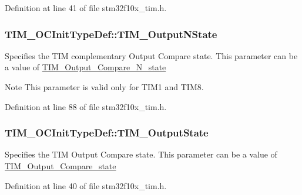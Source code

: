 Definition at line 41 of file stm32f10x\+\_\+tim.\+h.

\subsubsection[{\texorpdfstring{T\+I\+M\+\_\+\+Output\+N\+State}{TIM_OutputNState}}]{ T\+I\+M\+\_\+\+O\+C\+Init\+Type\+Def\+::\+T\+I\+M\+\_\+\+Output\+N\+State}\hypertarget{struct_t_i_m___o_c_init_type_def_a933904d2f892d0b945a908b9257fe869}{}\label{struct_t_i_m___o_c_init_type_def_a933904d2f892d0b945a908b9257fe869}
Specifies the T\+IM complementary Output Compare state. This parameter can be a value of \hyperlink{group___t_i_m___output___compare___n__state}{T\+I\+M\+\_\+\+Output\+\_\+\+Compare\+\_\+\+N\+\_\+state} \begin{DoxyNote}{Note}
This parameter is valid only for T\+I\+M1 and T\+I\+M8. 
\end{DoxyNote}


Definition at line 88 of file stm32f10x\+\_\+tim.\+h.

\subsubsection[{\texorpdfstring{T\+I\+M\+\_\+\+Output\+State}{TIM_OutputState}}]{ T\+I\+M\+\_\+\+O\+C\+Init\+Type\+Def\+::\+T\+I\+M\+\_\+\+Output\+State}\hypertarget{struct_t_i_m___o_c_init_type_def_af0c2c38c672effcb95b4ba8fc2896d1d}{}\label{struct_t_i_m___o_c_init_type_def_af0c2c38c672effcb95b4ba8fc2896d1d}
Specifies the T\+IM Output Compare state. This parameter can be a value of \hyperlink{group___t_i_m___output___compare__state}{T\+I\+M\+\_\+\+Output\+\_\+\+Compare\+\_\+state} 

Definition at line 40 of file stm32f10x\+\_\+tim.\+h.

